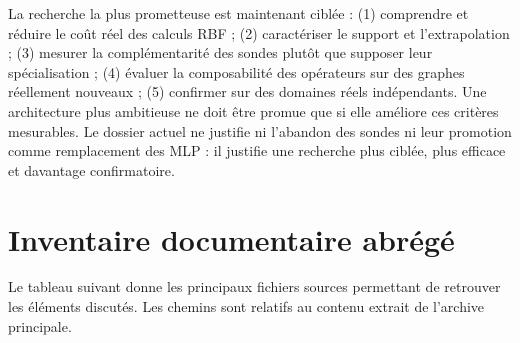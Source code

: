 \documentclass[11pt,a4paper]{article}
\begin{document}
La recherche la plus prometteuse est maintenant ciblée : (1) comprendre et réduire le coût réel des calculs RBF ; (2) caractériser le support et l'extrapolation ; (3) mesurer la complémentarité des sondes plutôt que supposer leur spécialisation ; (4) évaluer la composabilité des opérateurs sur des graphes réellement nouveaux ; (5) confirmer sur des domaines réels indépendants. Une architecture plus ambitieuse ne doit être promue que si elle améliore ces critères mesurables. Le dossier actuel ne justifie ni l'abandon des sondes ni leur promotion comme remplacement des MLP : il justifie une recherche plus ciblée, plus efficace et davantage confirmatoire.

\appendix
\section{Inventaire documentaire abrégé}

Le tableau suivant donne les principaux fichiers sources permettant de retrouver les éléments discutés. Les chemins sont relatifs au contenu extrait de l'archive principale.
\end{document}
